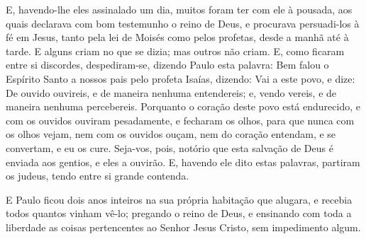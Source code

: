 E, havendo-lhe eles assinalado um dia, muitos foram ter com ele à
pousada, aos quais declarava com bom testemunho o reino de Deus, e
procurava persuadi-los à fé em Jesus, tanto pela lei de Moisés como
pelos profetas, desde a manhã até à tarde. E alguns criam no
que se dizia; mas outros não criam. E, como ficaram entre si
discordes, despediram-se, dizendo Paulo esta palavra: Bem falou o
Espírito Santo a nossos pais pelo profeta Isaías, dizendo:
Vai a este povo, e dize: De ouvido ouvireis, e de maneira nenhuma
entendereis; e, vendo vereis, e de maneira nenhuma percebereis.
Porquanto o coração deste povo está endurecido, e com os
ouvidos ouviram pesadamente, e fecharam os olhos, para que nunca com
os olhos vejam, nem com os ouvidos ouçam, nem do coração entendam, e
se convertam, e eu os cure. Seja-vos, pois, notório que esta
salvação de Deus é enviada aos gentios, e eles a ouvirão. E,
havendo ele dito estas palavras, partiram os judeus, tendo entre si
grande contenda.

E Paulo ficou dois anos inteiros na sua própria habitação que
alugara, e recebia todos quantos vinham vê-lo; pregando o
reino de Deus, e ensinando com toda a liberdade as coisas
pertencentes ao Senhor Jesus Cristo, sem impedimento algum.

